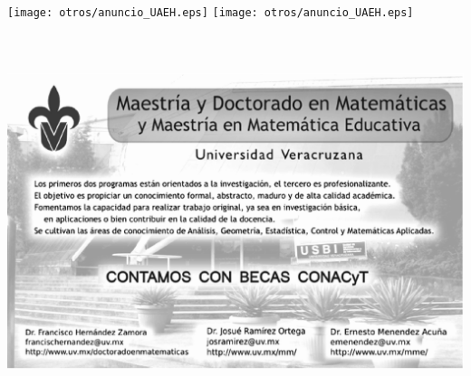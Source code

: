 \newpage
\thispagestyle{empty}


\texttt{[image: otros/anuncio\_UAEH.eps]}
\hspace{1cm}
\texttt{[image: otros/anuncio\_UAEH.eps]}
\begin{center}
\includegraphics[width=15cm,height=11cm]{otros/uv.eps}
\end{center}
